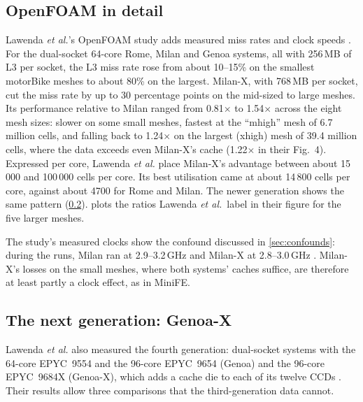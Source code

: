 \subsection{OpenFOAM in detail}
\label{sec:openfoam}
Lawenda \emph{et al.}'s OpenFOAM study adds measured miss rates and clock speeds \cite{lawendaEvaluatingImpactL32025}. For the dual-socket 64-core Rome, Milan and Genoa systems, all with 256\,MB of L3 per socket, the L3 miss rate rose from about 10--15\% on the smallest motorBike meshes to about 80\% on the largest. Milan-X, with 768\,MB per socket, cut the miss rate by up to 30 percentage points on the mid-sized to large meshes. Its performance relative to Milan ranged from 0.81$\times$ to 1.54$\times$ across the eight mesh sizes: slower on some small meshes, fastest at the ``mhigh'' mesh of 6.7 million cells, and falling back to 1.24$\times$ on the largest (xhigh) mesh of 39.4 million cells, where the data exceeds even Milan-X's cache (1.22$\times$ in their Fig.~4). Expressed per core, Lawenda \emph{et al.} place Milan-X's advantage between about 15\,000 and 100\,000 cells per core. Its best utilisation came at about 14\,800 cells per core, against about 4700 for Rome and Milan. The newer generation shows the same pattern (\cref{sec:genoax}).  plots the ratios Lawenda \emph{et al.}\ label in their figure for the five larger meshes.




The study's measured clocks show the confound discussed in \cref{sec:confounds}: during the runs, Milan ran at 2.9--3.2\,GHz and Milan-X at 2.8--3.0\,GHz \cite[Table~5]{lawendaEvaluatingImpactL32025}. Milan-X's losses on the small meshes, where both systems' caches suffice, are therefore at least partly a clock effect, as in MiniFE.

\subsection{The next generation: Genoa-X}
\label{sec:genoax}
Lawenda \emph{et al.} also measured the fourth generation: dual-socket systems with the 64-core EPYC~9554 and the 96-core EPYC~9654 (Genoa) and the 96-core EPYC~9684X (Genoa-X), which adds a cache die to each of its twelve CCDs \cite{lawendaEvaluatingImpactL32025}. Their results allow three comparisons that the third-generation data cannot.


